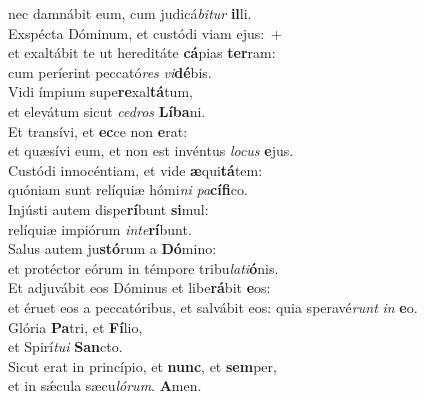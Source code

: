 \oddverse nec damnábit eum, cum judicá\textit{bi}\textit{tur} \textbf{il}li.\\
\evenverse Exspécta Dóminum, et custódi viam ejus:~+\\
\evenverse  et exaltábit te ut hereditáte \textbf{cá}pias \textbf{ter}ram:~\*\\
\evenverse cum períerint peccató\textit{res} \textit{vi}\textbf{dé}bis.\\
\oddverse Vidi ímpium supe\textbf{re}xal\textbf{tá}tum,~\*\\
\oddverse et elevátum sicut \textit{ce}\textit{dros} \textbf{Lí}\textbf{ba}ni.\\
\evenverse Et transívi, et \textbf{ec}ce non \textbf{e}rat:~\*\\
\evenverse et quæsívi eum, et non est invéntus \textit{lo}\textit{cus} \textbf{e}jus.\\
\oddverse Custódi innocéntiam, et vide \textbf{æ}qui\textbf{tá}tem:~\*\\
\oddverse quóniam sunt relíquiæ hómi\textit{ni} \textit{pa}\textbf{cí}\textbf{fi}co.\\
\evenverse Injústi autem dispe\textbf{rí}bunt \textbf{si}mul:~\*\\
\evenverse relíquiæ impiórum \textit{in}\textit{te}\textbf{rí}bunt.\\
\oddverse Salus autem ju\textbf{stó}rum a \textbf{Dó}mino:~\*\\
\oddverse et protéctor eórum in témpore tribu\textit{la}\textit{ti}\textbf{ó}nis.\\
\evenverse Et adjuvábit eos Dóminus et libe\textbf{rá}bit \textbf{e}os:~\*\\
\evenverse et éruet eos a peccatóribus, et salvábit eos: quia speravé\textit{runt} \textit{in} \textbf{e}o.\\
\oddverse Glória \textbf{Pa}tri, et \textbf{Fí}lio,~\*\\
\oddverse et Spirí\textit{tu}\textit{i} \textbf{San}cto.\\
\evenverse Sicut erat in princípio, et \textbf{nunc}, et \textbf{sem}per,~\*\\
\evenverse et in sǽcula sæcu\textit{ló}\textit{rum}. \textbf{A}men.\\
